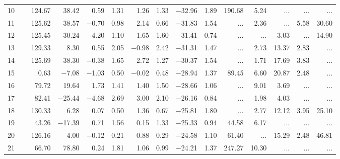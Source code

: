 \begin{table*}[p]
{\begin{tabular}{l@{ }r@{ \ }rr@{ \ }rr@{ \ }rrrr@{ \ }r@{ \ }r@{ \ }r@{ \ }r}
 10   \ \dotfill \  &    124.67 &     38.42 &    0.59 &   1.31 &    1.26 &   1.33 & $-$32.96 &   1.89 &      190.68 &        5.24 &    ...     &    ...     &    ...       \\     
 11   \ \dotfill \  &    125.62 &     38.57 &  $-$0.70 &   0.98 &    2.14 &   0.66& $-$31.83 &   1.54 &    ...     &        2.36 &    ...     &        5.58 &       30.60   \\     
 12   \ \dotfill \  &    125.45 &     30.24 &  $-$4.20 &   1.10 &    1.65 &   1.60& $-$31.41 &   0.74 &    ...     &    ...     &        3.03 &    ...     &       14.90   \\     
 13   \ \dotfill \  &    129.33 &      8.30 &    0.55 &   2.05 &  $-$0.98 &   2.42& $-$31.31 &   1.47 &    ...     &        2.73 &       13.37 &        2.83 &    ...       \\     
 14   \ \dotfill \  &    125.69 &     38.30 &  $-$0.38 &   1.65 &    2.72 &   1.27 & $-$30.37 &   1.54&    ...     &        1.71 &       17.69 &        3.83 &    ...       \\     
 15   \ \dotfill \  &      0.63 &    $-$7.08 &  $-$1.03 &   0.50 &  $-$0.02 &   0.48& $-$28.94 &   1.37&       89.45 &        6.60 &       20.87 &        2.48 &    ...       \\     
 16   \ \dotfill \  &     79.72 &     19.64 &    1.73 &   1.41 &    1.40 &   1.50& $-$28.66 &   1.06&    ...     &        9.01 &        3.69 &    ...     &    ...       \\     
 17   \ \dotfill \  &     82.41 &   $-$25.44 &  $-$4.68 &   2.69 &    3.00 &   2.10& $-$26.16 &   0.84&    ...     &        1.98 &        4.03 &    ...     &    ...       \\     
 18   \ \dotfill \  &    130.33 &      6.28 &    0.07 &   0.50 &    1.36 &   0.67& $-$25.81 &   1.80&    ...     &        2.77 &       12.12 &        3.95 &       25.10   \\     
 19   \ \dotfill \  &     43.26 &   $-$17.39 &    0.71 &   1.56 &    0.15 &   1.33& $-$25.33 &   0.94&       44.58 &        6.17 &    ...     &    ...     &    ...       \\     
 20   \ \dotfill \  &    126.16 &      4.00 &  $-$0.12 &   0.21 &    0.88 &   0.29& $-$24.58 &   1.10&       61.40 &    ...     &       15.29 &        2.48 &       46.81   \\     
 21   \ \dotfill \  &     66.70 &     78.80 &    0.24 &   1.81 &    1.06 &   0.99& $-$24.21 &   1.37&      247.27 &       10.30 &    ...     &    ...     &    ...       \\     

\end{tabular}}
\end{table*}
